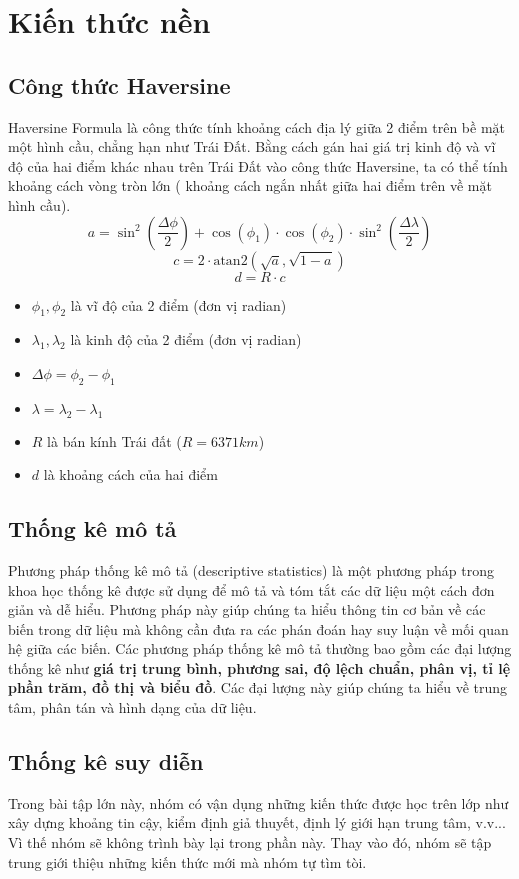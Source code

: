 \section{Kiến thức nền}\label{Kien thuc nen}
\subsection{Công thức Haversine}
Haversine Formula là công thức tính khoảng cách địa lý giữa 2 điểm trên bề mặt một hình cầu, chẳng hạn như Trái Đất. Bằng cách gán hai giá trị kinh độ và vĩ độ của hai điểm khác nhau trên Trái Đất vào công thức Haversine, ta có thể tính khoảng cách vòng tròn lớn ( khoảng cách ngắn nhất giữa hai điểm trên về mặt hình cầu).
\[
a = \sin^2\left(\frac{\Delta \phi}{2}\right) + \cos(\phi_1) \cdot \cos(\phi_2) \cdot \sin^2\left(\frac{\Delta \lambda}{2}\right)
\]
\[
c = 2 \cdot \text{atan2}\left(\sqrt{a}, \sqrt{1-a}\right)
\]
\[
d = R \cdot c
\]
\begin{itemize}
  \item \( \phi_1, \phi_2 \) là vĩ độ của 2 điểm (đơn vị radian)
  \item \( \lambda_1, \lambda_2 \) là kinh độ của 2 điểm (đơn vị radian)
  \item \( \Delta \phi = \phi_2 - \phi_1 \)
  \item \( \lambda = \lambda_2 - \lambda_1 \)
  \item \( R \) là bán kính Trái đất (\( R = 6371 km \))
  \item \( d \) là khoảng cách của hai điểm
\end{itemize}
\subsection{Thống kê mô tả}
Phương pháp thống kê mô tả (descriptive statistics) là một phương pháp trong khoa học thống kê được sử dụng để mô tả và tóm tắt các dữ liệu một cách đơn giản và dễ hiểu. Phương pháp này giúp chúng ta hiểu thông tin cơ bản về các biến trong dữ liệu mà không cần đưa ra các phán đoán hay suy luận về mối quan hệ giữa các biến. Các phương pháp thống kê mô tả thường bao gồm các đại lượng thống kê như \textbf{giá trị trung bình, phương sai, độ lệch chuẩn, phân vị, tỉ lệ phần trăm, đồ thị và biểu đồ}. Các đại lượng này giúp chúng ta hiểu về trung tâm, phân tán và hình dạng của dữ liệu.
\subsection{Thống kê suy diễn}
Trong bài tập lớn này, nhóm có vận dụng những kiến thức được học trên lớp như xây dựng khoảng tin cậy, kiểm định giả thuyết, định lý giới hạn trung tâm, v.v... Vì thế nhóm sẽ không trình bày lại trong phần này. Thay vào đó, nhóm sẽ tập trung giới thiệu những kiến thức mới mà nhóm tự tìm tòi.
